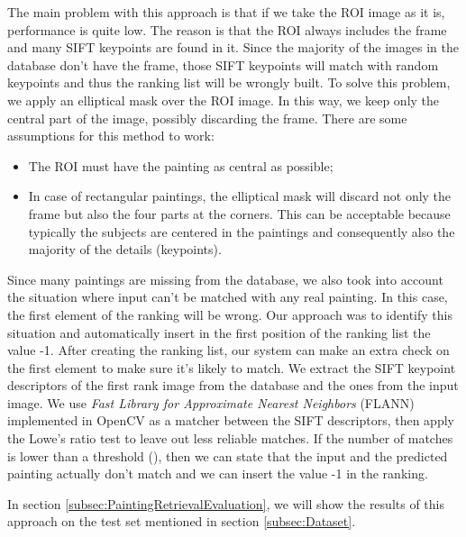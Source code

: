\documentclass[10pt,twocolumn,letterpaper]{article}
\begin{document}
The main problem with this approach is that if we take the ROI image as it is, performance is quite low. The reason is that the ROI always includes the frame and many SIFT keypoints are found in it. Since the majority of the images in the database don't have the frame, those SIFT keypoints will match with random keypoints and thus the ranking list will be wrongly built.
To solve this problem, we apply an elliptical mask over the ROI image. In this way, we keep only the central part of the image, possibly discarding the frame. There are some assumptions for this method to work:
\begin{itemize}
    \item The ROI must have the painting as central as possible;
    \item In case of rectangular paintings, the elliptical mask will discard not only the frame but also the four parts at the corners. This can be acceptable because typically the subjects are centered in the paintings and consequently also the majority of the details (\ie keypoints).
\end{itemize}

Since many paintings are missing from the database, we also took into account the situation where input can't be matched with any real painting. In this case, the first element of the ranking will be wrong. Our approach was to identify this situation and automatically insert in the first position of the ranking list the value -1. 
After creating the ranking list, our system can make an extra check on the first element to make sure it's likely to match. We extract the SIFT keypoint descriptors of the first rank image from the database and the ones from the input image. We use \textit{Fast Library for Approximate Nearest Neighbors} (FLANN) \cite{Muja09fastapproximate} implemented in OpenCV as a matcher between the SIFT descriptors, then apply the Lowe's ratio test to leave out less reliable matches. If the number of matches is lower than a threshold (), then we can state that the input and the predicted painting actually don't match and we can insert the value -1 in the ranking.

In section \ref{subsec:PaintingRetrievalEvaluation}, we will show the results of this approach on the test set mentioned in section \ref{subsec:Dataset}.
\end{document}
